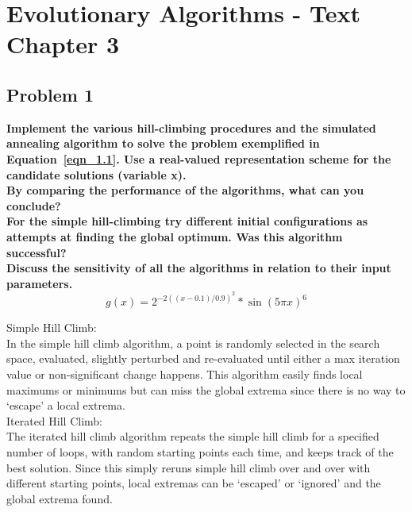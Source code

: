 
\chapter{Evolutionary Algorithms - Text Chapter 3}

\section{Problem 1}
\textbf{Implement the various hill-climbing procedures and the simulated annealing algorithm to solve the problem exemplified in Equation~\ref{eqn_1.1}. Use a real-valued representation scheme for the candidate solutions (variable x).} \newline \\
\textbf{By comparing the performance of the algorithms, what can you conclude?} \newline \\
\textbf{For the simple hill-climbing try different initial configurations as attempts at finding the global optimum. Was this algorithm successful?} \newline \\
\textbf{Discuss the sensitivity of all the algorithms in relation to their input parameters.} \newline \\
\begin{equation}\label{eqn_1.1}
g(x) = 2^{-2((x - 0.1) / 0.9)^2} * \sin(5 \pi x)^6
\end{equation}

Simple Hill Climb: \\

In the simple hill climb algorithm, a point is randomly selected in the search space, evaluated, slightly perturbed and re-evaluated until either a max iteration value or non-significant change happens.  This algorithm easily finds local maximums or minimums but can miss the global extrema since there is no way to `escape' a local extrema.\\

Iterated Hill Climb: \\

The iterated hill climb algorithm repeats the simple hill climb for a specified number of loops, with random starting points each time, and keeps track of the best solution. Since this simply reruns simple hill climb over and over with different starting points, local extremas can be `escaped' or `ignored' and the global extrema found. \\

